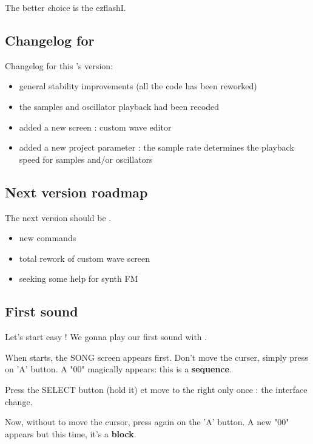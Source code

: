 \documentclass[12pt,a4paper]{article}
\begin{document}
    \medskip The better choice is the ezflashI.

    \subsection{Changelog for \fatversion}

    Changelog for this \FAT's version: \medskip
    \begin{itemize}
      \item{general stability improvements (all the code has been reworked)}
      \item{the samples and oscillator playback had been recoded}
      \item{added a new screen : custom wave editor}
      \item{added a new project parameter : the sample rate determines the playback speed for samples and/or oscillators}
    \end{itemize}

    \subsection{Next version roadmap}

    The next version should be \fatnextversion. \medskip
    \begin{itemize}
        \item{new commands}
        \item{total rework of custom wave screen}
        \item{seeking some help for synth FM}
    \end{itemize}

    \subsection{First sound}

    Let's start easy ! We gonna play our first sound with \FAT.\medskip

    When \FAT starts, the SONG screen appears first. Don't move the curser, simply press on 'A' button.
    A "00" magically appears: this is a {\bf sequence}.


    Press the SELECT button (hold it) et move to the right only once : the interface change.


    Now, without to move the cursor, press again on the 'A' button. A new "00" appears but this time, it's a {\bf block}.
\end{document}
